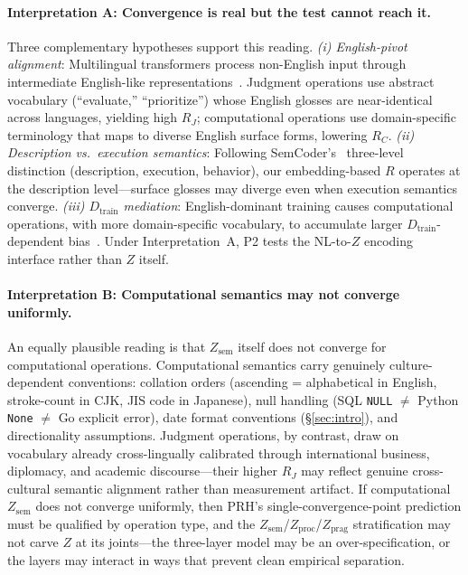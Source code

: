 \documentclass{article}
\theoremstyle{definition}
\newcommand{\Zsem}{Z_{\text{sem}}}
\newcommand{\Zproc}{Z_{\text{proc}}}
\newcommand{\Zprag}{Z_{\text{prag}}}
\newcommand{\Dtrain}{D_{\text{train}}}
\begin{document}
\paragraph{Interpretation A: Convergence is real but the test cannot reach it.}
Three complementary hypotheses support this reading. \emph{(i) English-pivot alignment}: Multilingual transformers process non-English input through intermediate English-like representations~\citep{wendler2024llamas}. Judgment operations use abstract vocabulary (``evaluate,'' ``prioritize'') whose English glosses are near-identical across languages, yielding high $R_J$; computational operations use domain-specific terminology that maps to diverse English surface forms, lowering $R_C$. \emph{(ii) Description vs.\ execution semantics}: Following SemCoder's~\citep{wan2024semcoder} three-level distinction (description, execution, behavior), our embedding-based $R$ operates at the description level---surface glosses may diverge even when execution semantics converge. \emph{(iii) $\Dtrain$ mediation}: English-dominant training causes computational operations, with more domain-specific vocabulary, to accumulate larger $\Dtrain$-dependent bias~\citep{wu2025semantichub}. Under Interpretation~A, P2 tests the NL-to-$Z$ encoding interface rather than $Z$ itself.

\paragraph{Interpretation B: Computational semantics may not converge uniformly.}
An equally plausible reading is that $\Zsem$ itself does not converge for computational operations. Computational semantics carry genuinely culture-dependent conventions: collation orders (ascending = alphabetical in English, stroke-count in CJK, JIS code in Japanese), null handling (SQL \texttt{NULL} $\neq$ Python \texttt{None} $\neq$ Go explicit error), date format conventions (\S\ref{sec:intro}), and directionality assumptions. Judgment operations, by contrast, draw on vocabulary already cross-lingually calibrated through international business, diplomacy, and academic discourse---their higher $R_J$ may reflect genuine cross-cultural semantic alignment rather than measurement artifact. If computational $\Zsem$ does not converge uniformly, then PRH's single-convergence-point prediction must be qualified by operation type, and the $\Zsem$/$\Zproc$/$\Zprag$ stratification may not carve $Z$ at its joints---the three-layer model may be an over-specification, or the layers may interact in ways that prevent clean empirical separation.
\end{document}
